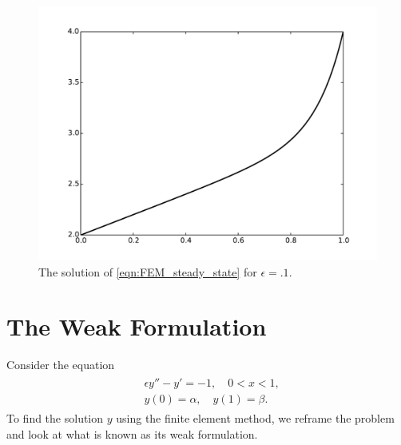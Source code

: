 
\begin{figure}[ht]
\centering
\includegraphics[width=\textwidth]{FEM_solution.pdf}
\caption{The solution of \eqref{eqn:FEM_steady_state} for $\epsilon = .1$.}
\label{fig:FEM_analytic_solution}
\end{figure}

\section*{The Weak Formulation}
Consider the equation
\begin{align}
	\begin{split}
	&{ }\epsilon y'' - y' = -1, \quad 0 < x < 1,\\
	&{ }y(0) = \alpha, \quad y(1) = \beta .
	\end{split}\label{eqn:FEM_eqn1}
\end{align}
To find the solution $y$ using the finite element method, we reframe the problem and look at what is known as its weak formulation.

